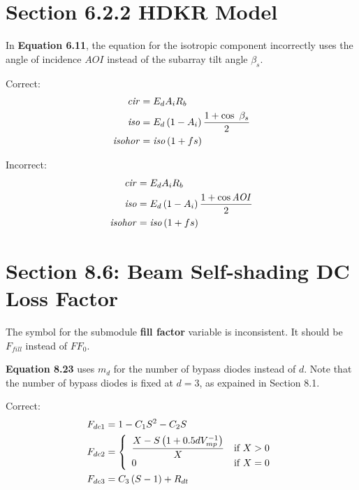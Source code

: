 \documentclass[report]{nrel}
\begin{document}
\section*{Section 6.2.2 HDKR Model}

In \textbf{Equation 6.11}, the equation for the isotropic component incorrectly uses the angle of incidence $\mathit{AOI}$ instead of the subarray tilt angle $\beta_s$.

Correct:
\begin{align*}
\mathit{cir} &= E_d A_i R_b \notag\\
\mathit{iso} &= E_d \left( 1 - A_i \right) \frac{1 + \cos\ \beta_s}{2} \notag\\
\mathit{isohor} &= \mathit{iso} \left( 1 + f s \right)
\end{align*}

Incorrect:
\begin{align*}
\mathit{cir} &= E_d A_i R_b \notag\\
\mathit{iso} &= E_d \left( 1 - A_i \right) \frac{1 + \cos\mathit{AOI}}{2} \notag\\
\mathit{isohor} &= \mathit{iso} \left( 1 + f s \right)
\end{align*}

\section*{Section 8.6: Beam Self-shading DC Loss Factor}

The symbol for the submodule \textbf{fill factor} variable is inconsistent. It should be $F_{fill}$ instead of $\mathit{FF}_0$.

\textbf{Equation 8.23} uses $m_d$ for the number of bypass diodes instead of $d$. Note that the number of bypass diodes is fixed at $d=3$, as expained in Section 8.1.

Correct:
\begin{align*}
F_{dc1} &= 1-C_1S^2-C_2S \notag\\ %
F_{dc2} &= 
\left\{
   \begin{array}{ll}
      \dfrac{X-S\left(1+0.5 d V^{-1}_{mp}\right)}{X} & \text{if $X>0$}\\
      0 & \text{if $X=0$}\\
   \end{array}
\right. \notag\\ %
F_{dc3} &= C_3\left(S-1\right)+R_{dt} %
\end{align*}
\end{document}
